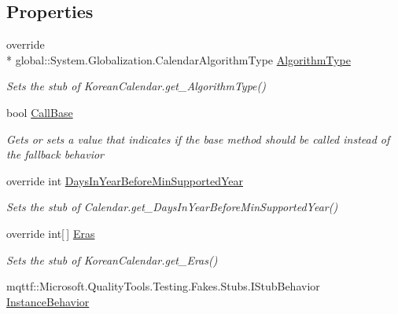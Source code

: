 \subsection*{Properties}
\begin{DoxyCompactItemize}
\item 
override \\*
global\-::\-System.\-Globalization.\-Calendar\-Algorithm\-Type \hyperlink{class_system_1_1_globalization_1_1_fakes_1_1_stub_korean_calendar_aebcf05a35824d103031041ead5d313cb}{Algorithm\-Type}
\begin{DoxyCompactList}\small\item\em Sets the stub of Korean\-Calendar.\-get\-\_\-\-Algorithm\-Type()\end{DoxyCompactList}\item 
bool \hyperlink{class_system_1_1_globalization_1_1_fakes_1_1_stub_korean_calendar_a50836b5fdac069960c960cc4dacec708}{Call\-Base}
\begin{DoxyCompactList}\small\item\em Gets or sets a value that indicates if the base method should be called instead of the fallback behavior\end{DoxyCompactList}\item 
override int \hyperlink{class_system_1_1_globalization_1_1_fakes_1_1_stub_korean_calendar_aadf2a7d572244ea187c2c5e74cb53da9}{Days\-In\-Year\-Before\-Min\-Supported\-Year}
\begin{DoxyCompactList}\small\item\em Sets the stub of Calendar.\-get\-\_\-\-Days\-In\-Year\-Before\-Min\-Supported\-Year()\end{DoxyCompactList}\item 
override int\mbox{[}$\,$\mbox{]} \hyperlink{class_system_1_1_globalization_1_1_fakes_1_1_stub_korean_calendar_a6c4db3d33aa53225d217a53d202fa188}{Eras}
\begin{DoxyCompactList}\small\item\em Sets the stub of Korean\-Calendar.\-get\-\_\-\-Eras()\end{DoxyCompactList}\item 
mqttf\-::\-Microsoft.\-Quality\-Tools.\-Testing.\-Fakes.\-Stubs.\-I\-Stub\-Behavior \hyperlink{class_system_1_1_globalization_1_1_fakes_1_1_stub_korean_calendar_a1ec80e6e5c642eb81c9a1c9ba6d09d66}{Instance\-Behavior}

\end{DoxyCompactItemize}
